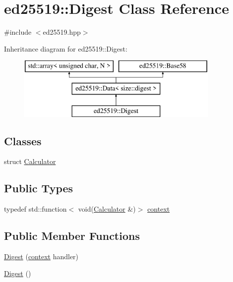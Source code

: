 \hypertarget{classed25519_1_1_digest}{}\section{ed25519\+:\+:Digest Class Reference}
\label{classed25519_1_1_digest}


{\ttfamily \#include $<$ed25519.\+hpp$>$}

Inheritance diagram for ed25519\+:\+:Digest\+:\begin{figure}[H]
\begin{center}
\leavevmode
\includegraphics[height=3.000000cm]{classed25519_1_1_digest}
\end{center}
\end{figure}
\subsection*{Classes}
\begin{DoxyCompactItemize}
\item 
struct \mbox{\hyperlink{structed25519_1_1_digest_1_1_calculator}{Calculator}}
\end{DoxyCompactItemize}
\subsection*{Public Types}
\begin{DoxyCompactItemize}
\item 
typedef std\+::function$<$ void(\mbox{\hyperlink{structed25519_1_1_digest_1_1_calculator}{Calculator}} \&)$>$ \mbox{\hyperlink{classed25519_1_1_digest_ae086cdedc0e704dd1d869138648b2d1a}{context}}
\end{DoxyCompactItemize}
\subsection*{Public Member Functions}
\begin{DoxyCompactItemize}
\item 
\mbox{\hyperlink{classed25519_1_1_digest_a18beea9fca7dd58df55300dd5e53420d}{Digest}} (\mbox{\hyperlink{classed25519_1_1_digest_ae086cdedc0e704dd1d869138648b2d1a}{context}} handler)
\item 
\mbox{\hyperlink{classed25519_1_1_digest_a032b74cccbe09b962b0d148ce6fa9eaa}{Digest}} ()
\end{DoxyCompactItemize}
